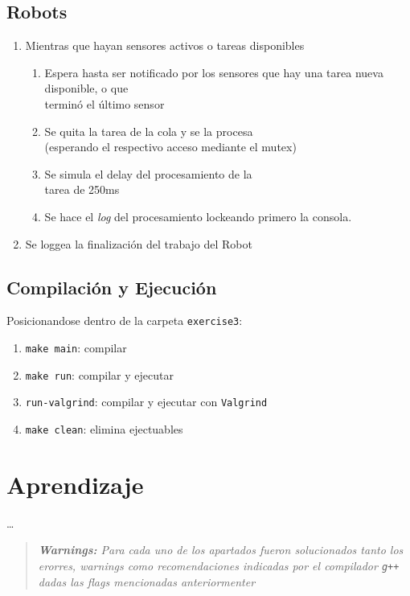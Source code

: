 \documentclass[11pt, a4paper]{article}
\begin{document}
\begin{multicols}{2}
\subsection{Robots}

\begin{enumerate}[label=\Roman*.]
    \item Mientras que hayan sensores activos o tareas disponibles
    \begin{enumerate}[label=\roman*.]
        \item Espera hasta ser notificado por los sensores que hay una tarea nueva disponible, o que\\terminó el último sensor
        \item Se quita la tarea de la cola y se la procesa\\(esperando el respectivo acceso mediante el mutex)
        \item Se simula el delay del procesamiento de la\\tarea de 250ms
        \item Se hace el \textit{log} del procesamiento lockeando primero la consola.
    \end{enumerate}
    \item Se loggea la finalización del trabajo del Robot
\end{enumerate}

\subsection{Compilación y Ejecución}

Posicionandose dentro de la carpeta \lstinline|exercise3|:

\begin{enumerate}[label=\roman*.]
    \item \lstinline|make main|: compilar
    \item \lstinline|make run|: compilar y ejecutar
    \item \lstinline|run-valgrind|: compilar y ejecutar con \lstinline|Valgrind|
    \item \lstinline|make clean|: elimina ejectuables
\end{enumerate}

\newpage

\section*{Aprendizaje}

\dots

\begin{quote}
    \small\itshape\textbf{Warnings:} Para cada uno de los apartados fueron solucionados tanto los erorres, warnings como recomendaciones
indicadas por el compilador \lstinline|g++| dadas las flags mencionadas anteriormenter
\end{quote}

\end{multicols}
\end{document}
